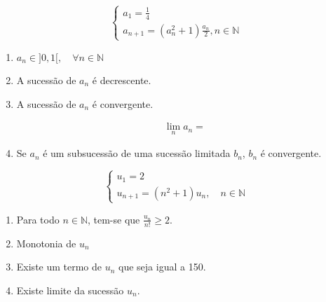 \documentclass[11pt, a4paper]{article}
\begin{document}

\begin{equation}
	\begin{cases}
		a_1 = \frac{1}{4} \\
		a_{n + 1} = (a^2_n + 1) \frac{a_n}{2}, n \in \mathbb{N}
	\end{cases}
\end{equation}

\begin{enumerate}[label=\arabic{section}.\arabic*.]
	\item
	      \begin{proposition}
		      $a_n \in ]0, 1[, \quad \forall n \in \mathbb{N}$
	      \end{proposition}
	\item
	      \begin{proposition}
		      A sucessão de $a_n$ é decrescente.
	      \end{proposition}
	\item
	      \begin{proposition}
		      A sucessão de $a_n$ é convergente.
	      \end{proposition}
	      \begin{align*}
		      \lim_{n} a_n =
	      \end{align*}
	\item
	      \begin{proposition}
		      Se $a_n$ é um subsucessão de uma sucessão limitada $b_n$, $b_n$ é
		      convergente.
	      \end{proposition}
\end{enumerate}


\begin{equation}
	\begin{cases}
		u_1 = 2 \\
		u_{n + 1} = (n^2 + 1)u_n, \quad n \in \mathbb{N}
	\end{cases}
\end{equation}

\begin{enumerate}[label=\arabic{section}.\arabic*.]
	\item
	      \begin{proposition}
		      Para todo $n \in \mathbb{N}$, tem-se que $\frac{u_n}{n!}\geq 2$.
	      \end{proposition}
	\item Monotonia de $u_n$
	\item
	      \begin{proposition}
		      Existe um termo de $u_n$ que seja igual a 150.
	      \end{proposition}
	\item
	      \begin{proposition}
		      Existe limite da sucessão $u_n$.
	      \end{proposition}
\end{enumerate}
\end{document}

